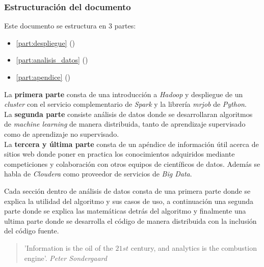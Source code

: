 \newpage

\subsubsection*{Estructuración del documento}
Este documento se estructura en 3 partes:
\begin{itemize}
  \item \autoref{part:despliegue} ()
  \item \autoref{part:analisis_datos} ()
  \item \autoref{part:apendice} ()
\end{itemize}
La \textbf{primera parte} consta de una introducción a \textit{Hadoop} y despliegue de un \textit{cluster} con el servicio
complementario de \textit{Spark} y la librería \textit{mrjob} de \textit{Python}.\\
La \textbf{segunda parte} consiste análisis de datos donde se desarrollaran algoritmos de 
\textit{machine learning} de manera distribuida, tanto de aprendizaje supervisado como de aprendizaje no supervisado.\\
La \textbf{tercera y última parte} consta de un apéndice de información útil acerca de sitios web 
donde poner en practica los conocimientos adquiridos mediante competiciones y colaboración con otros equipos de
científicos de datos. Además se habla de \textit{Cloudera} como proveedor de servicios de \textit{Big Data}.
\newline

Cada sección dentro de análisis de datos consta de una primera parte donde se explica la utilidad del algoritmo 
y sus casos de uso, a continuación una segunda parte donde se explica las matemáticas detrás del algoritmo y 
finalmente una ultima parte donde se desarrolla el código de manera distribuida con la inclusión del código fuente.

\vspace*{1.5cm}

\begin{quote}
    'Information is the oil of the $21st$ century, and analytics is the combustion engine'.
	 \newline \raggedleft \textit{Peter Sondergaard}
\end{quote}

\clearpage